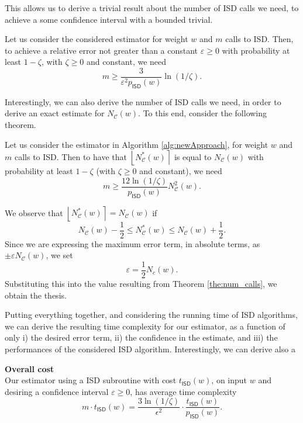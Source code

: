 This allows us to derive a trivial result about the number of ISD calls we need, to achieve a some confidence interval with a bounded trivial.

\begin{theorem}\label{the:num_calls}
Let us consider the considered estimator for weight $w$ and $m$ calls to ISD.
Then, to achieve a relative error not greater than a constant $\varepsilon \geq 0$ with probability at least $1-\zeta$, with $\zeta\geq 0$ and constant, we need
$$m\geq \frac{3}{\varepsilon^2 p_{\mathsf{ISD}}(w) }\ln(1/\zeta).$$
\end{theorem}
Interestingly, we can also derive the number of ISD calls we need, in order to derive an exact estimate for $N_{\mathscr C}(w)$.
To this end, consider the following theorem.
\begin{theorem}
Let us consider the estimator in Algorithm \ref{alg:newApproach}, for weight $w$ and $m$ calls to ISD.
Then to have that $\left\lfloor N^*_{\mathscr C}(w)\right\rceil$ is equal to $N_{\mathscr C}(w)$ with probability at least $1-\zeta$ (with $\zeta\geq 0$ and constant), we need
$$m\geq \frac{12\ln(1/\zeta) }{p_{\mathsf{ISD}}(w)}N_{\mathscr C}^2(w).$$
\end{theorem}
\begin{IEEEproof}
We observe that $\left\lfloor N_{\mathscr C}^*(w)\right\rceil = N_{\mathscr C}(w)$ if
$$N_{\mathscr C}(w) - \frac{1}{2}\leq N_{\mathscr C}^*(w)\leq N_{\mathscr C}(w) + \frac{1}{2}.$$
Since we are expressing the maximum error term, in absolute terms, as $\pm \varepsilon N_{\mathscr C}(w)$, we set 
$$\varepsilon = \frac{1}{2}  N_c(w).$$
Substituting this into the value resulting from Theorem \ref{the:num_calls}, we obtain the thesis.
\end{IEEEproof}
Putting everything together, and considering the running time of ISD algorithms, we can derive the resulting time complexity for our estimator, as a function of only i) the desired error term, ii) the confidence in the estimate, and iii) the performances of the considered ISD algorithm.
Interestingly, we can derive also a 
\begin{proposition}\textbf{Overall cost}\\
Our estimator using a ISD subroutine with cost $t_{\mathsf{ISD}}(w)$, on input $w$ and desiring a confidence interval $\varepsilon \geq 0$, has average time complexity
$$m\cdot t_{\mathsf{ISD}}(w) = \frac{3\ln(1/\zeta)}{\epsilon^2}\cdot\frac{t_{\mathsf{ISD}}(w)}{p_{\mathsf{ISD}}(w)}.$$
\end{proposition}

